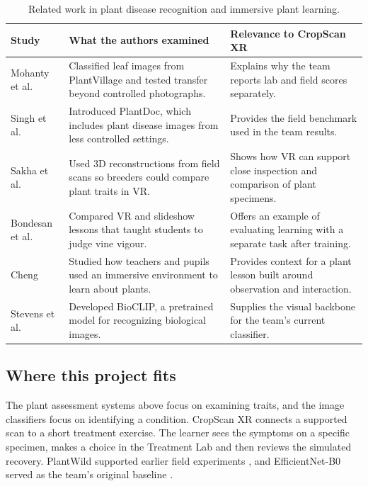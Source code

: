\documentclass[a4paper,11pt]{article}
\newcommand{\tabhead}[1]{\leavevmode\textbf{#1}}
\begin{document}
\begin{table}[!ht]
\caption{Related work in plant disease recognition and immersive plant learning.}\label{tab:lit}
\vspace{3pt}
\begin{tabularx}{\linewidth}{@{}P{.20\linewidth}LL@{}}
\toprule
\tabhead{Study} & \tabhead{What the authors examined} & \tabhead{Relevance to CropScan XR}\\
\midrule
Mohanty et al. \cite{mohanty} & Classified leaf images from PlantVillage and tested transfer beyond controlled photographs. & Explains why the team reports lab and field scores separately.\\
\addlinespace[3pt]
Singh et al. \cite{plantdoc} & Introduced PlantDoc, which includes plant disease images from less controlled settings. & Provides the field benchmark used in the team results.\\
\addlinespace[3pt]
Sakha et al. \cite{sakha} & Used 3D reconstructions from field scans so breeders could compare plant traits in VR. & Shows how VR can support close inspection and comparison of plant specimens.\\
\addlinespace[3pt]
Bondesan et al. \cite{bondesan} & Compared VR and slideshow lessons that taught students to judge vine vigour. & Offers an example of evaluating learning with a separate task after training.\\
\addlinespace[3pt]
Cheng \cite{cheng} & Studied how teachers and pupils used an immersive environment to learn about plants. & Provides context for a plant lesson built around observation and interaction.\\
\addlinespace[3pt]
Stevens et al. \cite{bioclip} & Developed BioCLIP, a pretrained model for recognizing biological images. & Supplies the visual backbone for the team's current classifier.\\
\bottomrule
\end{tabularx}
\end{table}

\subsection*{Where this project fits}
The plant assessment systems above focus on examining traits, and the image classifiers focus on identifying a condition. CropScan XR connects a supported scan to a short treatment exercise. The learner sees the symptoms on a specific specimen, makes a choice in the Treatment Lab and then reviews the simulated recovery. PlantWild supported earlier field experiments \cite{plantwild}, and EfficientNet-B0 served as the team's original baseline \cite{eff}.
\end{document}

